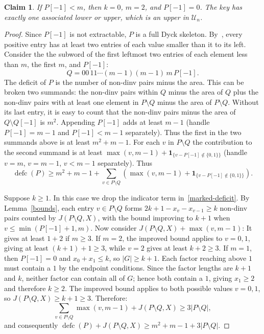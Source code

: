 \documentclass[11pt]{article}
\DeclareMathOperator{\defc}{defc}\DeclareMathOperator{\sym}{sym}
\newtheorem{claim}{Claim}
\begin{document}
\begin{claim}\label{below-maximum}
If $P[-1]<m$, then $k=0$, $m=2$, and $P[-1]=0$. The key has exactly one associated lower or upper, which is an upper in $\mathcal U_n$.
\end{claim}
\begin{proof}
Since $P[-1]$ is not extractable, $P$ is a full Dyck skeleton. By~\cite[Lemma~1.12]{H}, every positive entry has at least two entries of each value smaller than it to its left. Consider the the subword of the first leftmost two entries of each element less than $m$, the first $m$, and $P[-1]$:
\[
 Q=00\,11\cdots(m-1)(m-1)\,m\,P[-1].
\]
The deficit of $P$ is the number of non-dinv pairs minus the area. This can be broken two summands: the non-dinv pairs within $Q$ minus the area of $Q$ plus the non-dinv pairs with at least one element in $P \setminus Q$ minus the area of $P \setminus Q$.  Without its last entry, it is easy to count that the non-dinv pairs minus the area of  $Q \setminus Q[-1]$ is $m^2$. Appending $P[-1]$ adds at least $m-1$ (handle $P[-1]=m-1$ and $P[-1]<m-1$ separately). Thus the first in the two summands above is at least $m^2+m-1$.
For each $v$ in $P \setminus Q$ the contribution to the second summand is at least $\max(v,m-1)+\mathbf{1}_{\{v-P[-1]\notin\{0,1\}\}}$ (handle $v=m$, $v=m-1$, $v<m-1$ separately). Thus
\begin{equation}\label{marked-deficit}
 \defc(P)\ge m^2+m-1+\sum_{v\in P\setminus Q}\left(\max(v,m-1)+\mathbf{1}_{\{v-P[-1]\notin\{0,1\}\}}\right).
\end{equation}

Suppose $k\ge1$. In this case we drop the indicator term in~\eqref{marked-deficit}. By Lemma~\ref{bounds}, each entry $v \in P \setminus Q$ forms $2k+1-x_v-x_{v-1}\ge k$ non-dinv pairs counted by $J(P\setminus Q,X)$, with the bound improving to $k+1$ when $v\le\min(P[-1]+1,m)$. Now consider $J(P\setminus Q,X)+\max(v,m-1)$: It gives at least $1+2$ if $m\ge3$. If $m=2$, the improved bound applies to $v=0,1$, giving at least $(k+1)+1\ge3$, while $v=2$ gives at least $k+2\ge3$. If $m=1$, then $P[-1]=0$ and $x_0+x_1\le k$, so $|G|\ge k+1$. Each factor reaching above $1$ must contain a $1$ by the endpoint conditions. Since the factor lengths are $k+1$ and $k$, neither factor can contain all of $G$; hence both contain a $1$, giving $x_1\ge2$ and therefore $k\ge2$. The improved bound applies to both possible values $v=0,1$, so $J(P\setminus Q,X)  \ge k+1\ge3$. Therefore:
\[
 \sum_{v\in P\setminus Q}\max(v,m-1)+J(P\setminus Q,X)\ge3|P\setminus Q|,
\]
and consequently $\defc(P)+J(P\setminus Q,X)\ge m^2+m-1+3|P\setminus Q|$.


\end{proof}
\end{document}

